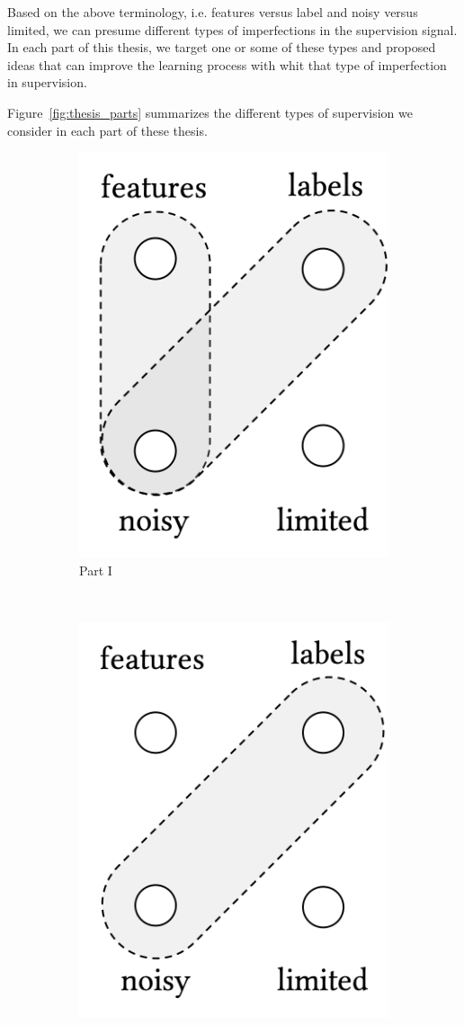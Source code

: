 Based on the above terminology, i.e. features versus label and noisy versus limited, we can presume different types of imperfections in the supervision signal. In each part of this thesis, we target one or some of these types and proposed ideas that can improve the learning process with whit that type of imperfection in supervision. 

Figure~\ref{fig:thesis_parts} summarizes the different types of supervision we consider in each part of these thesis.
\begin{figure}[t]
    \centering
    \begin{subfigure}[b]{0.32\textwidth}
    \centering
        \includegraphics[width=0.55\linewidth]{01-introduction/figs_and_tables/fig_p1.png}
        \caption{\label{fig:p1}Part I}
    \end{subfigure}
        ~ 
    \begin{subfigure}[b]{0.32\textwidth}
    \centering
        \includegraphics[width=0.55\linewidth]{01-introduction/figs_and_tables/fig_p2.png}

\end{subfigure}
\end{figure}
